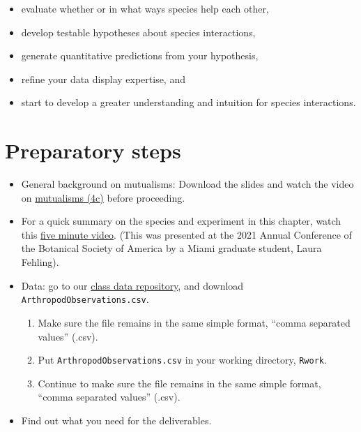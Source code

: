 \documentclass[
  letterpaper,
  DIV=11,
  numbers=noendperiod]{scrreprt}
\providecommand{\tightlist}{%
  \setlength{\itemsep}{0pt}\setlength{\parskip}{0pt}}
\begin{document}
\begin{itemize}
\tightlist
\item
  evaluate whether or in what ways species help each other,
\item
  develop testable hypotheses about species interactions,
\item
  generate quantitative predictions from your hypothesis,
\item
  refine your data display expertise, and
\item
  start to develop a greater understanding and intuition for species
  interactions.
\end{itemize}

\section{Preparatory steps}\label{preparatory-steps-5}

\begin{itemize}
\tightlist
\item
  General background on mutualisms: Download the slides and watch the
  video on
  \href{https://drive.google.com/drive/folders/1nWLoEGuWKIWdul9Uvse5qiB1Hf8MCwUv?usp=sharing}{mutualisms
  (4c)} before proceeding.
\item
  For a quick summary on the species and experiment in this chapter,
  watch this \href{https://youtu.be/R8kAzAWI4no}{five minute video}.
  (This was presented at the 2021 Annual Conference of the Botanical
  Society of America by a Miami graduate student, Laura Fehling).
\item
  Data: go to our
  \href{https://drive.google.com/drive/u/1/folders/1FR2FLiW3xyD4Er52YzVTToPZuXXReGRo}{class
  data repository}, and download \texttt{ArthropodObservations.csv}.

  \begin{enumerate}
  \def\labelenumi{\arabic{enumi}.}
  \tightlist
  \item
    Make sure the file remains in the same simple format, ``comma
    separated values'' (.csv).
  \item
    Put \texttt{ArthropodObservations.csv} in your working directory,
    \texttt{Rwork}.
  \item
    Continue to make sure the file remains in the same simple format,
    ``comma separated values'' (.csv).
  \end{enumerate}
\item
  Find out what you need for the deliverables.
\end{itemize}
\end{document}
